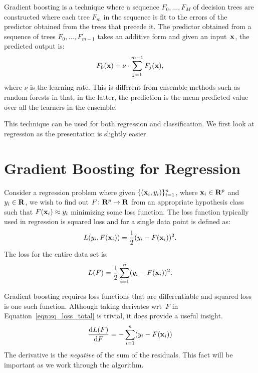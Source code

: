 Gradient boosting is a technique where a sequence 
$F_0, \ldots, F_M$ of decision trees are constructed where 
each tree $F_m$ in the sequence is fit to the errors of the 
predictor obtained from the trees that precede it. The predictor obtained 
from a sequence of trees $F_0, \ldots, F_{m - 1}$ takes an additive 
form and given an input~$\mathbf{x}$, the predicted output is:
\begin{equation}
    F_0(\mathbf{x}) + \nu \cdot \sum_{j = 1}^{m - 1} F_j(\mathbf{x}),
\end{equation}  
where $\nu$ is the learning rate. This is different from ensemble methods 
such as random forests in that, in the latter, the prediction is the mean predicted 
value over all the learners in the ensemble. 

This technique can be used for both regression and classification. We first look
at regression as the presentation is slightly easier.

\section{Gradient Boosting for Regression}
Consider a regression problem where given $\{ (\mathbf{x}_i, y_i)\}_{i = 1}^n$, 
where $\mathbf{x}_i \in \mathbf{R}^p$ and $y_i \in \mathbf{R}$, we wish to find out 
$F \colon \mathbf{R}^p \to \mathbf{R}$ from an appropriate hypothesis class 
such that $F(\mathbf{x}_i) \approx y_i$ minimizing some 
loss function. The loss function typically used in regression is squared loss
and for a single data point is defined as:
\begin{equation}  
    \label{eqn:sq_loss_single}
    L(y_i, F(\mathbf{x}_i)) = \frac{1}{2} (y_i - F(\mathbf{x}_i))^2. 
\end{equation}
The loss for the entire data set is:
\begin{equation}
    \label{eqn:sq_loss_total}
    L(F) = \frac{1}{2} \sum_{i = 1}^{n} (y_i - F(\mathbf{x}_i))^2.
\end{equation}

Gradient boosting requires loss functions that are differentiable and squared loss
is one such function. Although taking derivates wrt~$F$ 
in Equation~\ref{eqn:sq_loss_total} is trivial, it does provide a useful insight.
\begin{equation}
    \frac{\mathrm{d} L(F)}{\mathrm{d} F} 
        = - \sum_{i = 1}^n (y_i - F(\mathbf{x}_i))   
\end{equation}
The derivative is the \emph{negative} of the sum of the residuals. This fact 
will be important as we work through the algorithm.

